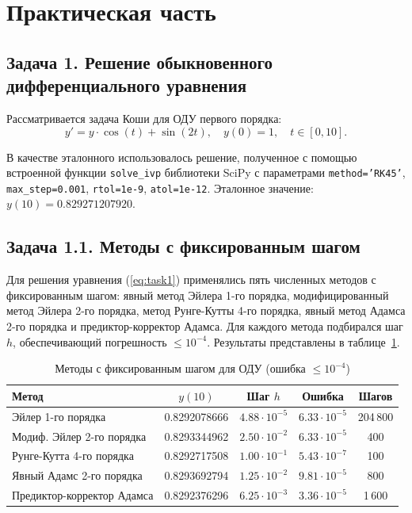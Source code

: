 \documentclass[a4paper]{article}
\begin{document}
\newpage

\section*{\centering\fontsize{14pt}{0pt}\selectfont\textbf{Практическая часть}\label{sec:practice}}

\subsection*{Задача 1. Решение обыкновенного дифференциального уравнения}

Рассматривается задача Коши для ОДУ первого порядка:
\begin{equation}
y' = y \cdot \cos(t) + \sin(2t), \quad y(0) = 1, \quad t \in [0, 10].
\label{eq:task1}
\end{equation}

В качестве эталонного использовалось решение, полученное с помощью встроенной функции \texttt{solve\_ivp} библиотеки SciPy с параметрами \texttt{method='RK45'}, \texttt{max\_step=0.001}, \texttt{rtol=1e-9}, \texttt{atol=1e-12}. Эталонное значение: $y(10) = 0.829271207920$.

\subsection*{Задача 1.1. Методы с фиксированным шагом}

Для решения уравнения (\ref{eq:task1}) применялись пять численных методов с фиксированным шагом: явный метод Эйлера 1-го порядка, модифицированный метод Эйлера 2-го порядка, метод Рунге-Кутты 4-го порядка, явный метод Адамса 2-го порядка и предиктор-корректор Адамса. Для каждого метода подбирался шаг $h$, обеспечивающий погрешность $\le 10^{-4}$. Результаты представлены в таблице~\ref{tab:task1_fixed}.

\begin{table}[H]
\centering
\caption{Методы с фиксированным шагом для ОДУ (ошибка $\le 10^{-4}$)}
\label{tab:task1_fixed}
\begin{tabular}{|l|c|c|c|c|}
\hline
\textbf{Метод} & \textbf{$y(10)$} & \textbf{Шаг $h$} & \textbf{Ошибка} & \textbf{Шагов} \\
\hline
Эйлер 1-го порядка      & 0.8292078666 & $4.88\cdot10^{-5}$ & $6.33\cdot10^{-5}$ & 204\,800 \\
Модиф. Эйлер 2-го порядка & 0.8293344962 & $2.50\cdot10^{-2}$ & $6.33\cdot10^{-5}$ & 400 \\
Рунге-Кутта 4-го порядка  & 0.8292717508 & $1.00\cdot10^{-1}$ & $5.43\cdot10^{-7}$ & 100 \\
Явный Адамс 2-го порядка  & 0.8293692794 & $1.25\cdot10^{-2}$ & $9.81\cdot10^{-5}$ & 800 \\
Предиктор-корректор Адамса & 0.8292376296 & $6.25\cdot10^{-3}$ & $3.36\cdot10^{-5}$ & 1\,600 \\
\hline
\end{tabular}
\end{table}
\end{document}
